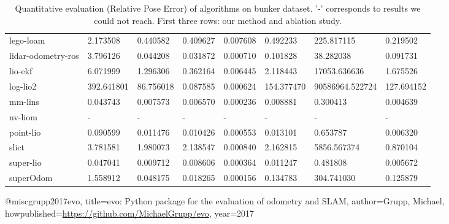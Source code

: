 \begin{table}[]
{\begin{tabular}{llllllll}
		lego-loam & 2.173508 & 0.440582 & 0.409627 & 0.007608 & 0.492233 & 225.817115 & 0.219502 \\
		lidar-odometry-ros & 3.796126 & 0.044208 & 0.031872 & 0.000710 & 0.101828 & 38.282038 & 0.091731 \\
		lio-ekf & 6.071999 & 1.296306 & 0.362164 & 0.006445 & 2.118443 & 17053.636636 & 1.675526 \\
		log-lio2 & 392.641801 & 86.756018 & 0.087585 & 0.000624 & 154.377470 & 90586964.522724 & 127.694152 \\
		mm-lins & 0.043743 & 0.007573 & 0.006570 & 0.000236 & 0.008881 & 0.300413 & 0.004639 \\
		nv-liom & - & - & - & - & - & - & - \\
		point-lio & 0.090599 & 0.011476 & 0.010426 & 0.000553 & 0.013101 & 0.653787 & 0.006320 \\
		slict & 3.781581 & 1.980073 & 2.138547 & 0.000840 & 2.162815 & 5856.567374 & 0.870104 \\
		super-lio & 0.047041 & 0.009712 & 0.008606 & 0.000364 & 0.011247 & 0.481808 & 0.005672 \\
		superOdom & 1.558912 & 0.048175 & 0.018265 & 0.000156 & 0.134783 & 304.741030 & 0.125879 \\
        	\end{tabular}%
        }
        	\caption{Quantitative evaluation (Relative Pose Error\cite{grupp2017evo}) of algorithms on bunker dataset. '-' corresponds to results we could not reach. First three rows: our method and ablation study.}
        	\label{table3}
\end{table}

@misc{grupp2017evo,
  title={evo: Python package for the evaluation of odometry and SLAM},
  author={Grupp, Michael},
  howpublished={\url{https://github.com/MichaelGrupp/evo}},
  year={2017}
}
